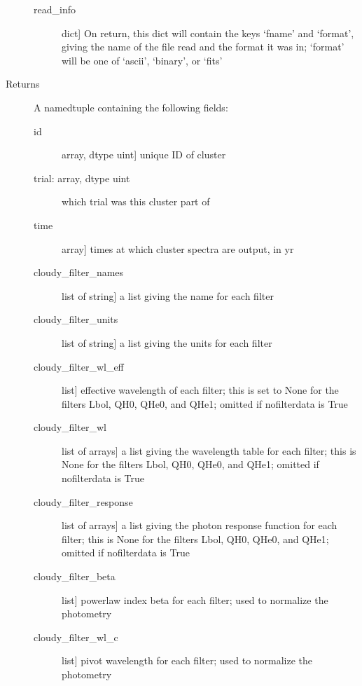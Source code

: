 \documentclass[letterpaper,10pt,english]{sphinxmanual}
\begin{document}
\begin{fulllineitems}
\begin{description}
\begin{description}
\item[{read\_info}] \leavevmode{[}dict{]}
On return, this dict will contain the keys ‘fname’ and
‘format’, giving the name of the file read and the format it
was in; ‘format’ will be one of ‘ascii’, ‘binary’, or ‘fits’

\end{description}

\item[{Returns}] \leavevmode
A namedtuple containing the following fields:
\begin{description}
\item[{id}] \leavevmode{[}array, dtype uint{]}
unique ID of cluster

\item[{trial: array, dtype uint}] \leavevmode
which trial was this cluster part of

\item[{time}] \leavevmode{[}array{]}
times at which cluster spectra are output, in yr

\item[{cloudy\_filter\_names}] \leavevmode{[}list of string{]}
a list giving the name for each filter

\item[{cloudy\_filter\_units}] \leavevmode{[}list of string{]}
a list giving the units for each filter

\item[{cloudy\_filter\_wl\_eff}] \leavevmode{[}list{]}
effective wavelength of each filter; this is set to None for the
filters Lbol, QH0, QHe0, and QHe1; omitted if nofilterdata is
True

\item[{cloudy\_filter\_wl}] \leavevmode{[}list of arrays{]}
a list giving the wavelength table for each filter; this is
None for the filters Lbol, QH0, QHe0, and QHe1; omitted if
nofilterdata is True

\item[{cloudy\_filter\_response}] \leavevmode{[}list of arrays{]}
a list giving the photon response function for each filter;
this is None for the filters Lbol, QH0, QHe0, and QHe1; omitted
if nofilterdata is True

\item[{cloudy\_filter\_beta}] \leavevmode{[}list{]}
powerlaw index beta for each filter; used to normalize the
photometry

\item[{cloudy\_filter\_wl\_c}] \leavevmode{[}list{]}
pivot wavelength for each filter; used to normalize the photometry


\end{description}
\end{description}
\end{fulllineitems}
\end{document}
